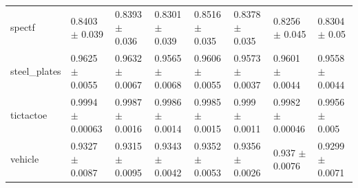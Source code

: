 \begin{tabular}{llllllll}
spectf & 0.8403 $\pm$ 0.039 & 0.8393 $\pm$ 0.036 & 0.8301 $\pm$ 0.039 & 0.8516 $\pm$ 0.035 & 0.8378 $\pm$ 0.035 & 0.8256 $\pm$ 0.045 & 0.8304 $\pm$ 0.05 \\
steel\_plates & 0.9625 $\pm$ 0.0055 & 0.9632 $\pm$ 0.0067 & 0.9565 $\pm$ 0.0068 & 0.9606 $\pm$ 0.0055 & 0.9573 $\pm$ 0.0037 & 0.9601 $\pm$ 0.0044 & 0.9558 $\pm$ 0.0044 \\
tictactoe & 0.9994 $\pm$ 0.00063 & 0.9987 $\pm$ 0.0016 & 0.9986 $\pm$ 0.0014 & 0.9985 $\pm$ 0.0015 & 0.999 $\pm$ 0.0011 & 0.9982 $\pm$ 0.00046 & 0.9956 $\pm$ 0.005 \\
vehicle & 0.9327 $\pm$ 0.0087 & 0.9315 $\pm$ 0.0095 & 0.9343 $\pm$ 0.0042 & 0.9352 $\pm$ 0.0053 & 0.9356 $\pm$ 0.0026 & 0.937 $\pm$ 0.0076 & 0.9299 $\pm$ 0.0071 \\
\bottomrule
\end{tabular}
